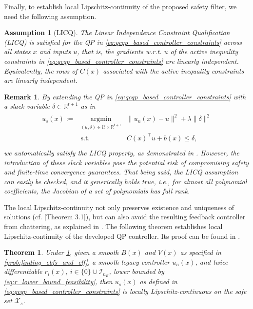 \documentclass[lettersize,journal]{IEEEtran}
\newcommand{\R}{\mathbb{R}}
\newtheorem{theorem}{Theorem}
\newtheorem{assumption}{Assumption}
\newtheorem{remark}{Remark}
\begin{document}
Finally, to establish local Lipschitz-continuity of the proposed safety filter, we need the following assumption.
\begin{assumption}[LICQ] \label{ass:licq}
   The Linear Independence Constraint Qualification (LICQ) is satisfied for the QP in \cref{eq:qcqp_based_controller_constraints} across all states $x$ and inputs $u$, that is, the gradients w.r.t. $u$ of the active inequality constraints in \cref{eq:qcqp_based_controller_constraints} are linearly independent.
   Equivalently, the rows of $C(x)$ associated with the active inequality constraints are linearly independent.
\end{assumption}
\begin{remark}
   \textit{
      By extending the QP in \cref{eq:qcqp_based_controller_constraints} with a slack variable $\delta \in \R^{t+1}$ as in \cite{ames2016control}
      \begin{align*}
         \begin{array}{llll}
            u_s(x) := &\underset{(u,\delta) \in \mathcal U \times \R^{t+1}}{\mbox{argmin}} & \| u_n(x) - u \|^2 + \lambda \| \delta \|^2 \\
            &\mbox{s.t.} & C(x)^\top u + b(x) \leq \delta, \\
         \end{array}
      \end{align*}
      we automatically satisfy the LICQ property, as demonstrated in \cite{ames2016control}.
      However, the introduction of these slack variables pose the potential risk of compromising safety and finite-time convergence guarantees.
      That being said, the LICQ assumption can easily be checked, and it generically holds true, i.e., for almost all polynomial coefficients, the Jacobian of a set of polynomials has full rank.
   }
\end{remark}

The local Lipschitz-continuity not only preserves existence and uniqueness of solutions (cf. \cite{Khalil:02}[Theorem 3.1]), but can also avoid the resulting feedback controller from chattering, as explained in \cite{morris2013sufficient}.
The following theorem establishes local Lipschitz-continuity of the developed QP controller.
Its proof can be found in \cite{schneeberger2024advanced}.
\begin{theorem} \label{thm:lipschitz_continuity}
   Under \cref{ass:licq},
   given a smooth $B(x)$ and $V(x)$ as specified in \cref{prob:finding_cbfs_and_clf},
   a smooth legacy controller $u_n(x)$,
   and twice differentiable $r_i(x)$, $i \in \{0\} \cup \mathcal I_{n_{\!B}}$, lower bounded by \cref{eq:r_lower_bound_feasibility},
   then $u_s(x)$ as defined in \cref{eq:qcqp_based_controller_constraints} is locally Lipschitz-continuous on the safe set $\mathcal X_s$.
\end{theorem}
\end{document}
